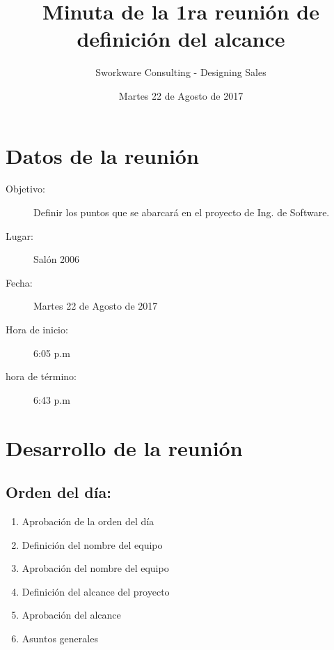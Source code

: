 \documentclass[12pt]{article}
\title{Minuta de la 1ra reunión de definición del alcance}
\author{Sworkware Consulting - Designing Sales}
\date{Martes 22 de Agosto de 2017} %
\begin{document}
\maketitle
\tableofcontents

\section{Datos de la reunión}
\begin{description}
	\item[Objetivo:] Definir los puntos que se abarcará en el proyecto de Ing. de Software.
	\item[Lugar:] Salón 2006
	\item[Fecha:] Martes 22 de Agosto de 2017
	\item[Hora de inicio:] 6:05 p.m
	\item[hora de término:] 6:43 p.m
\end{description}

\section{Desarrollo de la reunión}

\subsection{Orden del día:}
\begin{enumerate}
 	\item Aprobación de la orden del día
	\item Definición del nombre del equipo
	\item Aprobación del nombre del equipo
	\item Definición del alcance del proyecto
	\item Aprobación del alcance
	\item Asuntos generales
\end{enumerate}
\end{document}
